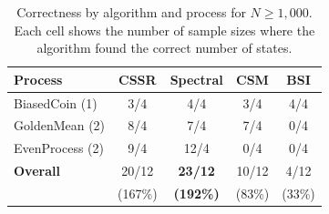 \begin{table}[htbp]
\centering
\begin{tabular}{lcccc}
\toprule
\textbf{Process} & \textbf{CSSR} & \textbf{Spectral} & \textbf{CSM} & \textbf{BSI} \\
\midrule
BiasedCoin (1) & 3/4 & 4/4 & 3/4 & 4/4 \\
GoldenMean (2) & 8/4 & 7/4 & 7/4 & 0/4 \\
EvenProcess (2) & 9/4 & 12/4 & 0/4 & 0/4 \\
\midrule
\textbf{Overall} & 20/12 & \textbf{23/12} & 10/12 & 4/12 \\
  & (167\%) & \textbf{(192\%)} & (83\%) & (33\%) \\
\bottomrule
\end{tabular}
\caption{Correctness by algorithm and process for $N \geq 1{,}000$. Each cell shows the number of sample sizes where the algorithm found the correct number of states.}
\label{tab:correctness}
\end{table}
